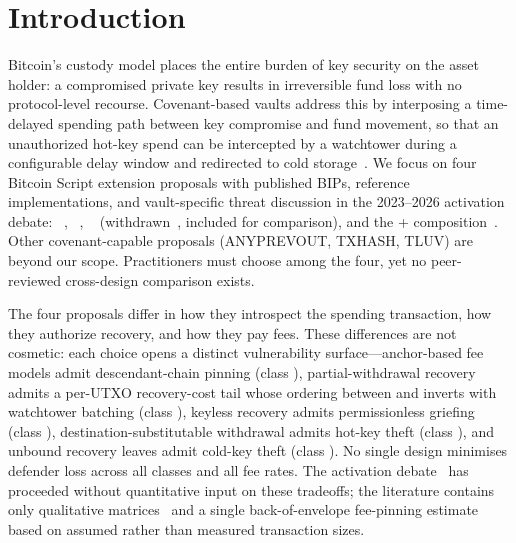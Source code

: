 
\section{Introduction}
\label{sec:intro}

Bitcoin's custody model places the entire burden of key security on the
asset holder: a compromised private key results in irreversible fund loss
with no protocol-level recourse. Covenant-based vaults address this by
interposing a time-delayed spending path between key compromise and fund
movement, so that an unauthorized hot-key spend can be intercepted by a
watchtower during a configurable delay window and redirected to cold
storage~\cite{SHMB20,MES16}. We focus on four Bitcoin Script
extension proposals with published BIPs, reference implementations,
and vault-specific threat discussion in the 2023--2026 activation
debate: \opctv{}~\cite{BIP119}, \opccv{}~\cite{BIP443}, \opvault{}~\cite{BIP345}
(withdrawn~\cite{OB25}, included for comparison), and the
\opcat{}+\opcsfs{} composition~\cite{BIP347,BIP348}. Other
covenant-capable proposals (ANYPREVOUT, TXHASH, TLUV) are beyond our
scope. Practitioners must choose among the four, yet no peer-reviewed
cross-design comparison exists.

The four proposals differ in how they introspect the spending
transaction, how they authorize recovery, and how they pay fees. These
differences are not cosmetic: each choice opens a distinct
vulnerability surface---anchor-based fee models admit descendant-chain
pinning (class \classfee{}), partial-withdrawal recovery admits a
per-UTXO recovery-cost tail whose ordering between \opccv{} and
\opvault{} inverts with watchtower batching (class \classscale{}),
keyless recovery admits permissionless griefing (class \classgrief{}),
destination-substitutable withdrawal admits hot-key theft
(class \classhot{}), and unbound recovery leaves admit
cold-key theft (class \classcold{}). No single design minimises
defender loss across all classes and all fee rates. The
activation debate~\cite{CTVCSFS25,Poinsot25,Towns25,OB25} has proceeded
without quantitative input on these tradeoffs; the literature contains
only qualitative matrices~\cite{covenants_info} and a single
back-of-envelope fee-pinning estimate~\cite{Har24} based on assumed
rather than measured transaction sizes.


